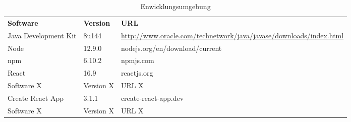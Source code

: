 \begin{table}[h]
	\centering
	\begin{tabularx}{\textwidth}{l l X}
		\rowcolor[HTML]{C0C0C0} 
		\textbf{Software} & \textbf{Version} & \textbf{URL} \\
		Java Development Kit & 8u144 & \url{http://www.oracle.com/technetwork/java/javase/downloads/index.html} \\
		\rowcolor[HTML]{E7E7E7} 
		Node & 12.9.0 & nodejs.org/en/download/current \\
		npm & 6.10.2 & npmjs.com \\
		\rowcolor[HTML]{E7E7E7} 
		React &16.9 &reactjs.org\\
		Software X & Version X & URL X \\
		\rowcolor[HTML]{E7E7E7} 
		Create React App & 3.1.1 & create-react-app.dev \\
		Software X & Version X & URL X \\
	\end{tabularx}
	\caption{Enwicklungsumgebung}
	\label{table:entwicklungsumgebung}
\end{table}